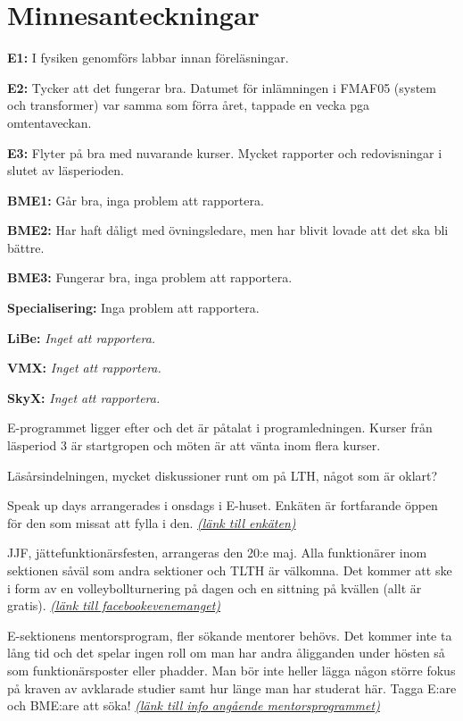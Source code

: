 \documentclass[10pt]{article}
\begin{document}
\section*{Minnesanteckningar}
\begin{paragrafer}
\textbf{E1:} I fysiken genomförs labbar innan föreläsningar.

\textbf{E2:} Tycker att det fungerar bra. Datumet för inlämningen i FMAF05 (system och transformer) var samma som förra året, tappade en vecka pga omtentaveckan.

\textbf{E3:} Flyter på bra med nuvarande kurser. Mycket rapporter och redovisningar i slutet av läsperioden.

\textbf{BME1:} Går bra, inga problem att rapportera. 

\textbf{BME2:} Har haft dåligt med övningsledare, men har blivit lovade att det ska bli bättre. 
 
\textbf{BME3:} Fungerar bra, inga problem att rapportera. 
 
\textbf{Specialisering:} Inga problem att rapportera.

\textbf{LiBe:} \textit{Inget att rapportera.}

\textbf{VMX:} \textit{Inget att rapportera.}

\textbf{SkyX:} \textit{Inget att rapportera.}

 E-programmet ligger efter och det är påtalat i programledningen. Kurser från läsperiod 3 är startgropen och möten är att vänta inom flera kurser.

\item{Läsårsindelningen, mycket diskussioner runt om på LTH, något som är oklart?}

\item{Speak up days arrangerades i onsdags i E-huset. Enkäten är fortfarande öppen för den som missat att fylla i den. \textit{\href{https://www.tinyurl.com/sud17}{(länk till enkäten)}}}

\item{JJF, jättefunktionärsfesten, arrangeras den 20:e maj. Alla funktionärer inom sektionen såväl som andra sektioner och TLTH är välkomna. Det kommer att ske i form av en volleybollturnering på dagen och en sittning på kvällen (allt är gratis). \textit{\href{https://www.facebook.com/events/1325332067532352/}{(länk till facebookevenemanget)}}}

\item{E-sektionens mentorsprogram, fler sökande mentorer behövs. Det kommer inte ta lång tid och det spelar ingen roll om man har andra åligganden under hösten så som funktionärsposter eller phadder. Man bör inte heller lägga någon större fokus på kraven av avklarade studier samt hur länge man har studerat här. Tagga E:are och BME:are att söka! \textit{\href{https://drive.google.com/file/d/0B7WHZ6wh42IALXdoTlZidk1yNEk/view?usp=sharing}{(länk till info angående mentorsprogrammet)}}}


\end{paragrafer}
\end{document}

